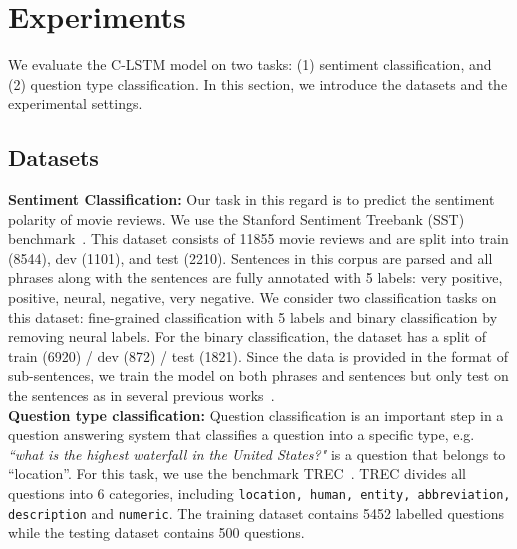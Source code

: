 \documentclass[11pt,letterpaper]{article}
\begin{document}
\section{Experiments}
We evaluate the C-LSTM model on two tasks: (1) sentiment classification,
and (2) question type classification. In this section, we introduce the
datasets and the experimental settings.

\subsection{Datasets}
{\bf Sentiment Classification: } Our task in this regard is to
predict the sentiment polarity of movie reviews. We use the
Stanford Sentiment Treebank (SST) benchmark~\cite{socher2013}. This
dataset consists of 11855 movie reviews and are split into train (8544),
dev (1101), and test (2210). Sentences in this corpus are parsed and all
phrases along with the sentences are fully annotated with 5 labels: very
positive, positive, neural, negative, very negative. We consider two
classification tasks on this dataset: fine-grained classification with 5
labels and binary classification by removing neural labels. For the
binary classification, the dataset has a split of
train (6920) / dev (872) / test (1821). Since the data is provided in the
format of sub-sentences, we train the model on both phrases and sentences but
only test on the sentences as in several previous
works~\cite{socher2013,dcnn}.\\
{\bf Question type classification: }Question classification is an
important step in a question answering system that classifies a question
into a specific type, e.g. \textit{``what is the highest waterfall in
the United States?"} is a question that belongs to ``location''. For
this task, we use the benchmark TREC~\cite{trec}. TREC divides all
questions into 6 categories, including \texttt{location, human, entity,
abbreviation, description} and \texttt{numeric}. The training dataset
contains 5452 labelled questions while the testing dataset contains 500
questions.
\end{document}
